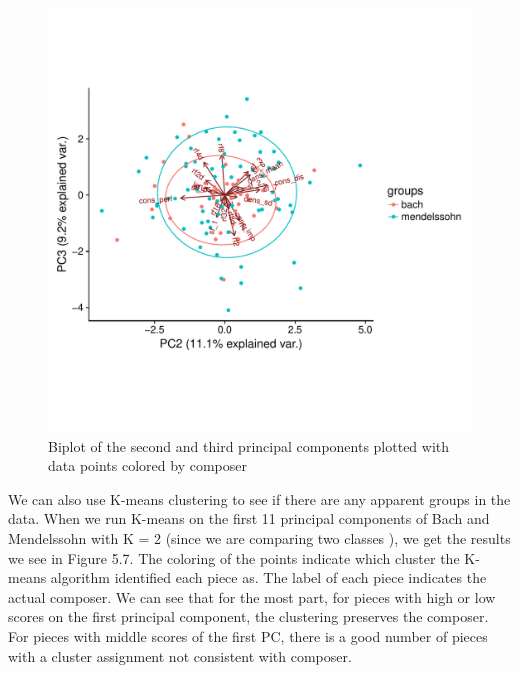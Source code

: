 \documentclass[12pt,twoside]{reedthesis}
\theoremstyle{definition}
\theoremstyle{definition}
\theoremstyle{definition}
\theoremstyle{remark}
\begin{document}
\begin{figure}[H]
\centering
\includegraphics[scale = .5]{images/bi_elipse23.pdf}
\caption{Biplot of the second and third principal components plotted with data points colored by composer}
\label{subd}
\end{figure}
We can also use K-means clustering to see if there are any apparent
groups in the data. When we run K-means on the first 11 principal
components of Bach and Mendelssohn with K = 2 (since we are comparing
two classes ), we get the results we see in Figure 5.7. The coloring of
the points indicate which cluster the K-means algorithm identified each
piece as. The label of each piece indicates the actual composer. We can
see that for the most part, for pieces with high or low scores on the
first principal component, the clustering preserves the composer. For
pieces with middle scores of the first PC, there is a good number of
pieces with a cluster assignment not consistent with composer.
\end{document}
